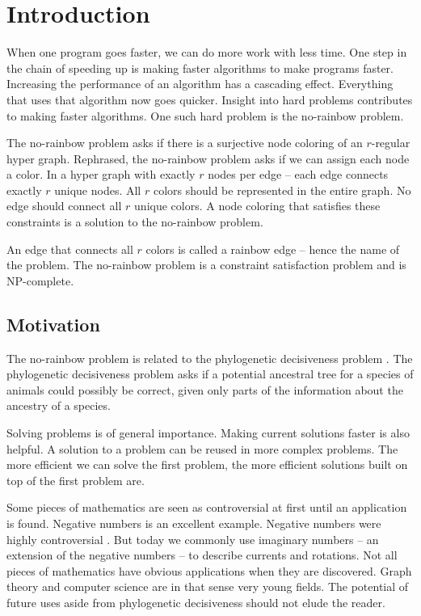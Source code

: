 \documentclass[msc,lith,english]{liuthesis}
\author{Edvard Thörnros}
\begin{document}
\chapter{Introduction}
\label{chaIntro}
When one program goes faster, we can do more work with less time.
One step in the chain of speeding up is making faster algorithms to make programs faster.
Increasing the performance of an algorithm has a cascading effect. 
Everything that uses that algorithm now goes quicker.
Insight into hard problems contributes to making faster algorithms.
One such hard problem is the no-rainbow problem.

The no-rainbow problem \cite{sourceNoRainbow} asks if there is a surjective node coloring of an $r$-regular hyper graph.
Rephrased, the no-rainbow problem asks if we can assign each node a color.
In a hyper graph with exactly $r$ nodes per edge -- each edge connects exactly $r$ unique nodes.
All $r$ colors should be represented in the entire graph.
No edge should connect all $r$ unique colors.
A node coloring that satisfies these constraints is a solution to the no-rainbow problem.

An edge that connects all $r$ colors is called a rainbow edge -- hence the name of the problem.
The no-rainbow problem is a constraint satisfaction problem and is NP-complete.

\section{Motivation}
The no-rainbow problem is related to the phylogenetic decisiveness problem \cite{sourceNoRainbow, sourcePhylogeneticDecisiveness}. The
phylogenetic decisiveness problem asks if a potential ancestral tree for a
species of animals could possibly be correct, given only parts of the
information about the ancestry of a species.

Solving problems is of general importance. Making current solutions faster is also helpful.
A solution to a problem can be reused in more complex problems. The more
efficient we can solve the first problem, the more efficient solutions built on
top of the first problem are. 

Some pieces of mathematics are seen as controversial at first until an application is found.
Negative numbers is an excellent example. Negative numbers were highly
controversial \cite{sourceNeg}. But today we commonly use imaginary numbers -- an extension of the negative numbers -- to
describe currents and rotations. Not all pieces of mathematics have obvious
applications when they are discovered. Graph theory and computer science are in
that sense very young fields.
The potential of future uses aside from phylogenetic decisiveness should not elude the reader.
\end{document}
